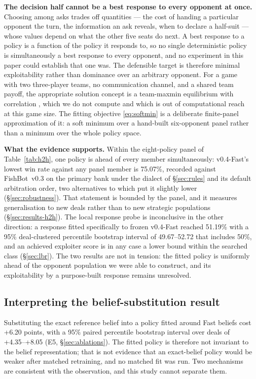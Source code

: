 \documentclass[11pt]{article}
\theoremstyle{definition}
\DeclareRobustCommand{\vfast}{\texorpdfstring{\mbox{v0.4-Fast}}{v0.4-Fast}}
\DeclareRobustCommand{\vthree}{\texorpdfstring{\mbox{FishBot v0.3}}{FishBot v0.3}}
\newcommand{\numWorstCase}{75.07}
\newcommand{\numAblBlock}{+6.20}
\newcommand{\numAblBlockCI}{+4.35--+8.05}
\newcommand{\numLBRFour}{51.19}
\newcommand{\numLBRFourCI}{49.67--52.72}
\begin{document}
\textbf{The decision half cannot be a best response to every opponent at once.}
Choosing among asks trades off quantities --- the cost of handing a particular
opponent the turn, the information an ask reveals, when to declare a half-suit
--- whose values depend on what the other five seats do next. A best response to
a policy is a function of the policy it responds to, so no single deterministic
policy is simultaneously a best response to every opponent, and no experiment in
this paper could establish that one was. The defensible target is therefore
minimal exploitability rather than dominance over an arbitrary opponent. For a
game with two three-player teams, no communication channel, and a shared team
payoff, the appropriate solution concept is a team-maxmin equilibrium with
correlation \cite{celli-gatti,zhang-tbdag}, which we do not compute and which is
out of computational reach at this game size. The fitting objective
\eqref{eq:softmin} is a deliberate finite-panel approximation of it: a soft
minimum over a hand-built six-opponent panel rather than a minimum over the whole
policy space.

\textbf{What the evidence supports.} Within the eight-policy panel of
Table~\ref{tab:h2h}, one policy is ahead of every member simultaneously:
\vfast's lowest win rate against any panel member is \numWorstCase\%, recorded
against \vthree{} on the primary bank under the dialect of \S\ref{sec:rules} and
its default arbitration order, two alternatives to which put it slightly lower
(\S\ref{sec:robustness}).
That statement is bounded by the panel, and it measures generalisation to new
deals rather than to new strategic populations (\S\ref{sec:results-h2h}). The
local response probe is inconclusive in the other direction: a response fitted
specifically to frozen \vfast{} reached \numLBRFour\% with a 95\% deal-clustered
percentile bootstrap interval of \numLBRFourCI{} that includes 50\%, and an
achieved exploiter score is in any case a lower bound within the searched class
(\S\ref{sec:lbr}). The two results are not in tension: the fitted policy is
uniformly ahead of the opponent population we were able to construct, and its
exploitability by a purpose-built response remains unresolved.

\subsection{Interpreting the belief-substitution result}

Substituting the exact reference belief into a policy fitted around Fast beliefs
cost \numAblBlock{} points, with a 95\% paired percentile bootstrap interval over
deals of \numAblBlockCI{} (E5, \S\ref{sec:ablations}). The fitted policy is
therefore not invariant to the belief representation; that is not evidence that
an exact-belief policy would be weaker after matched retraining, and no matched
fit was run. Two mechanisms are consistent with the observation, and this study
cannot separate them.
\end{document}
